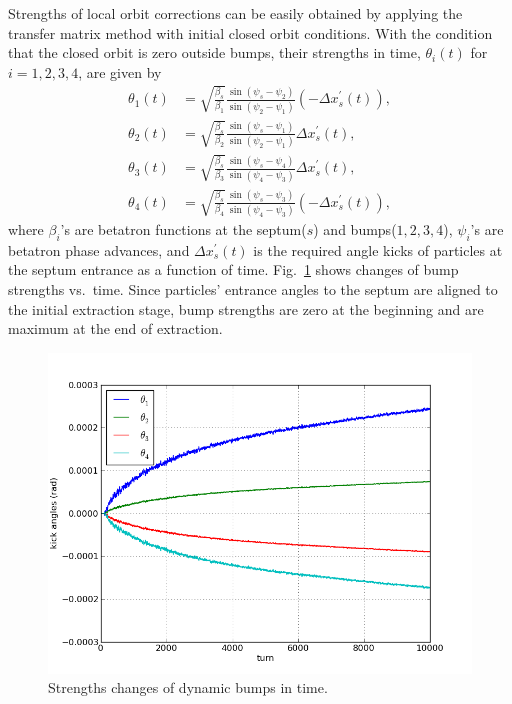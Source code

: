 \documentclass[aps,prstab,onecolumn,preprint,endfloats,11pt]{revtex4-1}
\begin{document}
Strengths of local orbit corrections can be easily obtained by applying the transfer matrix method with initial closed orbit conditions.
With the condition that the closed orbit is zero outside bumps, their strengths in time, $\theta_{i}(t)$ for $i=1,2,3,4$, are given by
\begin{equation}
  \begin{split}
  \theta_{1}(t) & = \sqrt{\frac{\beta_{s}}{\beta_{1}}}
               \frac{\sin(\psi_{s} - \psi_{2})}
                    {\sin(\psi_{2} - \psi_{1})}
               \left( - \Delta x_{s}^{\prime} (t) \right),
  \\ %
  \theta_{2}(t) & = \sqrt{\frac{\beta_{s}}{\beta_{2}}}
               \frac{\sin(\psi_{s} - \psi_{1})}
                    {\sin(\psi_{2} - \psi_{1})}
               \Delta x_{s}^{\prime} (t), \\
  \theta_{3}(t) & = \sqrt{\frac{\beta_{s}}{\beta_{3}}}
               \frac{\sin(\psi_{s} - \psi_{4})}
                    {\sin(\psi_{4} - \psi_{3})}
               \Delta x_{s}^{\prime} (t),
  \\ %
  \theta_{4}(t) & = \sqrt{\frac{\beta_{s}}{\beta_{4}}}
               \frac{\sin(\psi_{s} - \psi_{3})}
                    {\sin(\psi_{4} - \psi_{3})}
               \left( - \Delta x_{s}^{\prime} (t) \right),
  \end{split}
\end{equation}
where $\beta_{i}$'s are betatron functions at the septum($s$) and bumps($1,2,3,4$), $\psi_{i}$'s are betatron phase advances, and $\Delta x^{\prime}_{s} (t)$ is the required angle kicks of particles at the septum entrance as a function of time.
Fig.~\ref{fig:bump2} shows changes of bump strengths vs.~time.
Since particles' entrance angles to the septum are aligned to the initial extraction stage, bump strengths are zero at the beginning and are maximum at the end of extraction.

\begin{figure}[!tbp]
  \includegraphics[width=.45\textwidth]{img/20140123-00.png}
  \caption{\label{fig:bump2}Strengths changes of dynamic bumps in time.}
\end{figure}
\end{document}
